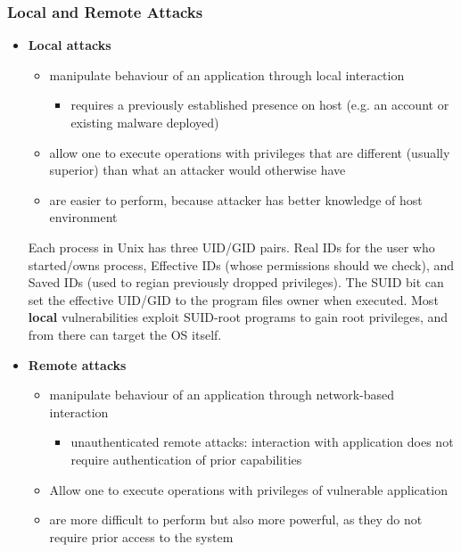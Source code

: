 \documentclass{article}
\begin{document}
\subsubsection{Local and Remote Attacks}
\begin{itemize}
    \item \textbf{Local attacks}
    \begin{itemize}
        \item manipulate behaviour of an application through local interaction
        \begin{itemize}
            \item requires a previously established presence on host (e.g. an account or existing malware deployed)
        \end{itemize}
        \item allow one to execute operations with privileges that are different (usually superior) than what an attacker would otherwise have
        \item are easier to perform, because attacker has better knowledge of host environment
    \end{itemize}
    Each process in Unix has three UID/GID pairs. Real IDs for the user who started/owns process, Effective IDs (whose permissions should we check), and Saved IDs (used to regian previously dropped privileges). The SUID bit can set the effective UID/GID to the program files owner when executed. Most \textbf{local} vulnerabilities exploit SUID-root programs to gain root privileges, and from there can target the OS itself.
    \item \textbf{Remote attacks}
    \begin{itemize}
        \item manipulate behaviour of an application through network-based interaction
        \begin{itemize}
            \item unauthenticated remote attacks: interaction with application does not require authentication of prior capabilities 
        \end{itemize}
        \item Allow one to execute operations with privileges of vulnerable application
        \item are more difficult to perform but also more powerful, as they do not require prior access to the system
    \end{itemize}
\end{itemize}
\end{document}

